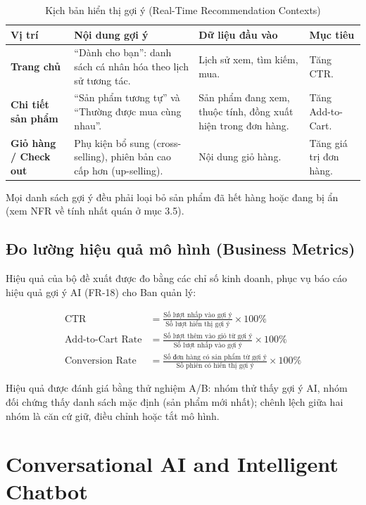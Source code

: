 \documentclass[12pt,a4paper,oneside]{report}
\begin{document}
\begin{longtable}{p{3.4cm}p{5.4cm}p{3.6cm}p{3.4cm}}
\caption{Kịch bản hiển thị gợi ý (Real-Time Recommendation Contexts)}\\
\toprule
\textbf{Vị trí} & \textbf{Nội dung gợi ý} & \textbf{Dữ liệu đầu vào} & \textbf{Mục tiêu} \\
\midrule
\endhead
\bottomrule
\endlastfoot
\textbf{Trang chủ} & ``Dành cho bạn'': danh sách cá nhân hóa theo lịch sử tương tác. & Lịch sử xem, tìm kiếm, mua. & Tăng CTR. \\
\textbf{Chi tiết sản phẩm} & ``Sản phẩm tương tự'' và ``Thường được mua cùng nhau''. & Sản phẩm đang xem, thuộc tính, đồng xuất hiện trong đơn hàng. & Tăng Add-to-Cart. \\
\textbf{Giỏ hàng / Check out} & Phụ kiện bổ sung (cross-selling), phiên bản cao cấp hơn (up-selling). & Nội dung giỏ hàng. & Tăng giá trị đơn hàng. \\
\end{longtable}

Mọi danh sách gợi ý đều phải loại bỏ sản phẩm đã hết hàng hoặc đang bị ẩn (xem NFR về tính nhất quán ở mục 3.5).

\subsection{Đo lường hiệu quả mô hình (Business Metrics)}

Hiệu quả của bộ đề xuất được đo bằng các chỉ số kinh doanh, phục vụ báo cáo hiệu quả gợi ý AI (FR-18) cho Ban quản lý:

\begin{align}
\text{CTR} &= \frac{\text{Số lượt nhấp vào gợi ý}}{\text{Số lượt hiển thị gợi ý}} \times 100\% \\
\text{Add-to-Cart Rate} &= \frac{\text{Số lượt thêm vào giỏ từ gợi ý}}{\text{Số lượt nhấp vào gợi ý}} \times 100\% \\
\text{Conversion Rate} &= \frac{\text{Số đơn hàng có sản phẩm từ gợi ý}}{\text{Số phiên có hiển thị gợi ý}} \times 100\%
\end{align}

Hiệu quả được đánh giá bằng thử nghiệm A/B: nhóm thử thấy gợi ý AI, nhóm đối chứng thấy danh sách mặc định (sản phẩm mới nhất); chênh lệch giữa hai nhóm là căn cứ giữ, điều chỉnh hoặc tắt mô hình.

\section{Conversational AI and Intelligent Chatbot}
\end{document}
